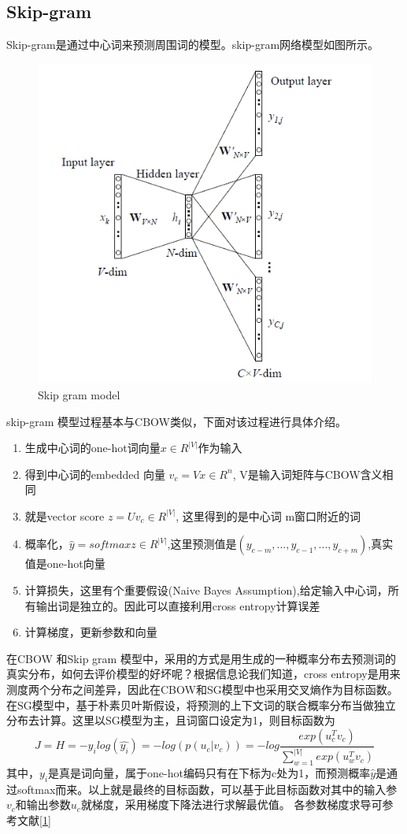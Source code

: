 \documentclass[twoside,nofonts,fancyhdr,openany,UTF8]{ctexbook}
\begin{document}
\subsection{Skip-gram}
Skip-gram是通过中心词来预测周围词的模型。skip-gram网络模型如图所示。
\begin{figure}[!htb]
\centering
\includegraphics[scale=0.3]{skip-gram}
\caption{Skip gram model}
\end{figure}
skip-gram 模型过程基本与CBOW类似，下面对该过程进行具体介绍。
\begin{enumerate}
\item 生成中心词的one-hot词向量$x \in R^{|V|}$作为输入
\item 得到中心词的embedded 向量 $v_{c}=Vx \in R^{n}$, V是输入词矩阵与CBOW含义相同
\item 就是vector score $z=Uv_{c} \in R^{|V|}$, 这里得到的是中心词 m窗口附近的词
\item 概率化，$\widehat{y}=softmax{z} \in R^{|V|}$,这里预测值是$(y_{c-m},...,y_{c-1},...,y_{c+m})$,真实值是one-hot向量
\item 计算损失，这里有个重要假设(Naive Bayes Assumption),给定输入中心词，所有输出词是独立的。因此可以直接利用cross entropy计算误差
\item 计算梯度，更新参数和向量
\end{enumerate}

在CBOW 和Skip gram 模型中，采用的方式是用生成的一种概率分布去预测词的真实分布，如何去评价模型的好坏呢？根据信息论我们知道，cross entropy是用来测度两个分布之间差异，因此在CBOW和SG模型中也采用交叉熵作为目标函数。在SG模型中，基于朴素贝叶斯假设，将预测的上下文词的联合概率分布当做独立分布去计算。这里以SG模型为主，且词窗口设定为1，则目标函数为
$$J = H = -y_{i}log(\widehat{y_{i}}) = -log(p(u_{c}|v_c)) = -log\frac{exp(u_{c}^{T}v_{c})}{\sum_{w=1}^{|V|}exp(u_{w}^{T}v_{c})}$$
其中，$y_i$是真是词向量，属于one-hot编码只有在下标为c处为1，而预测概率$\widehat{y}$是通过softmax而来。以上就是最终的目标函数，可以基于此目标函数对其中的输入参$v_{c}$和输出参数$u_{c}$就梯度，采用梯度下降法进行求解最优值。
各参数梯度求导可参考文献\href{http://shomy.top/2017/07/28/word2vec-all/}{[1]}
\end{document}
